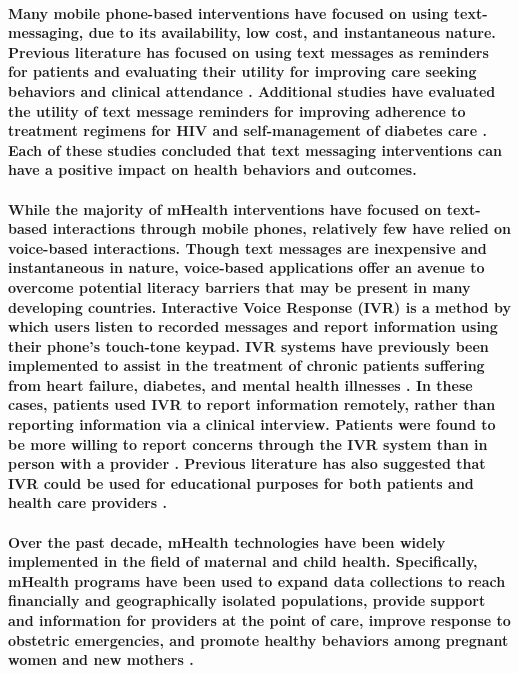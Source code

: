\paragraph{Many mobile phone-based interventions have focused on using text-messaging, due to its availability, low cost, and instantaneous nature.  Previous literature has focused on using text messages as reminders for patients and evaluating their utility for improving care seeking behaviors \citep{ColeLewis2010} and clinical attendance \citep{Guy2012}. Additional studies have evaluated the utility of text message reminders for improving adherence to treatment regimens for HIV \citep{Horvath2012} and self-management of diabetes care \citep{Krishna2008}. Each of these studies concluded that text messaging interventions can have a positive impact on health behaviors and outcomes.}

\paragraph{While the majority of mHealth interventions have focused on text-based interactions through mobile phones, relatively few have relied on voice-based interactions. Though text messages are inexpensive and instantaneous in nature, voice-based applications offer an avenue to overcome potential literacy barriers that may be present in many developing countries. Interactive Voice Response (IVR) is a method by which users listen to recorded messages and report information using their phone's touch-tone keypad. IVR systems have  previously been implemented to assist in the treatment of chronic patients suffering from heart failure, diabetes, and mental health illnesses \citep{Piette2000}. In these cases, patients used IVR to report information remotely, rather than reporting information via a clinical interview. Patients were found to be more willing to report concerns through the IVR system than in person with a provider \citep{Piette2000}. Previous literature has also suggested that IVR could be used for educational purposes for both patients and health care providers \citep{Labrique2013, Lee2003}.}

\paragraph{Over the past decade, mHealth technologies have been widely implemented in the field of maternal and child health. Specifically, mHealth programs have been used to expand data collections to reach financially and geographically isolated populations, provide support and information for providers at the point of care, improve response to obstetric emergencies, and promote healthy behaviors among pregnant women and new mothers \citep{Tamrat2012}.}

